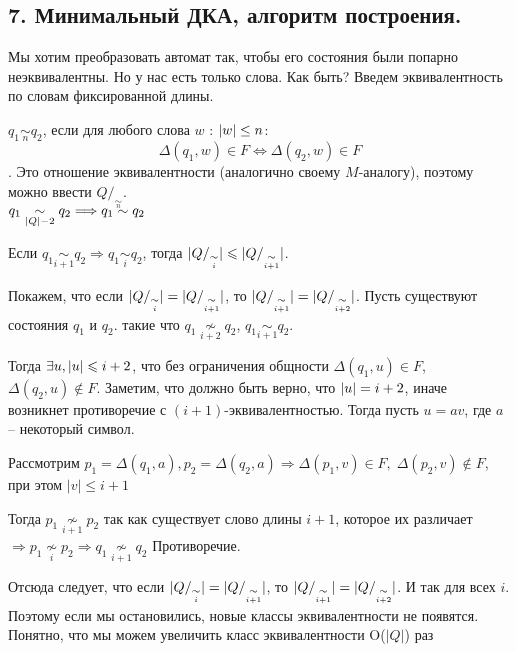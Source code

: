 \subsection{7. Минимальный ДКА, алгоритм построения.}
Мы хотим преобразовать автомат так, чтобы его состояния были попарно неэквивалентны. Но у нас есть только слова. Как быть? Введем эквивалентность по словам фиксированной длины.

\Def $q_1 \underset{n}{\sim} q_2$, если для любого слова $w$ : $\arrowvert w \arrowvert \leq n$:
$$\Delta(q_1, w) \in F \Longleftrightarrow \Delta(q_2, w) \in F$$.
Это отношение эквивалентности (аналогично своему $M$-аналогу), поэтому можно ввести $Q/_{\underset{n}{\sim}}$.\\

\Lemma $q_1 \underset{\arrowvert Q \arrowvert - 2}{\sim} q_2 \Longrightarrow q_1 \sim q_2  $

\Proof Если $q_1 \underset{i + 1}{\sim} q_2 \Longrightarrow q_1 \underset{i}{\sim} q_2$, тогда $\arrowvert Q /_{\underset{i}{\sim}} \arrowvert \leqslant \arrowvert Q /_{\underset{i + 1}{\sim}} \arrowvert$.

Покажем, что если $\arrowvert Q /_{\underset{i}{\sim}} \arrowvert = \arrowvert Q /_{\underset{i + 1}{\sim}} \arrowvert$, то $\arrowvert Q /_{\underset{i + 1}{\sim}} \arrowvert = \arrowvert Q /_{\underset{i + 2}{\sim}} \arrowvert$. Пусть существуют состояния $q_1$ и $q_2$. такие что $q_1 \underset{i + 2}{\nsim} q_2$, $q_1 \underset{i + 1}{\sim} q_2$.

Тогда $\exists u, \arrowvert u \arrowvert \leqslant i + 2$, что без ограничения общности $\Delta(q_1, u) \in F$, $\Delta (q_2, u) \notin F$. Заметим, что должно быть верно, что $\arrowvert u \arrowvert = i + 2$, иначе возникнет противоречие с $(i + 1)$-эквивалентностью. Тогда пусть $u = av$, где $a$ -- некоторый символ. 

Рассмотрим $p_1 = \Delta(q_1, a), p_2 = \Delta(q_2, a) \Longrightarrow \Delta(p_1,v)\in F, \; \Delta(p_2,v)\notin F$, при этом $|v| \leqslant i + 1$

Тогда $p_1 \underset{i + 1}{\nsim} p_2$ так как существует слово длины $i+1$, которое их различает $\Longrightarrow p_1 \underset{i}{\nsim} p_2 \Longrightarrow q_1 \underset{i + 1}{\nsim} q_2$ Противоречие.

Отсюда следует, что если $\arrowvert Q /_{\underset{i}{\sim}} \arrowvert = \arrowvert Q /_{\underset{i + 1}{\sim}} \arrowvert$, то $\arrowvert Q /_{\underset{i + 1}{\sim}} \arrowvert = \arrowvert Q /_{\underset{i + 2}{\sim}} \arrowvert$. И так для всех $i$. Поэтому если мы остановились, новые классы эквивалентности не появятся. Понятно, что мы можем увеличить класс эквивалентности O($|Q|$) раз

